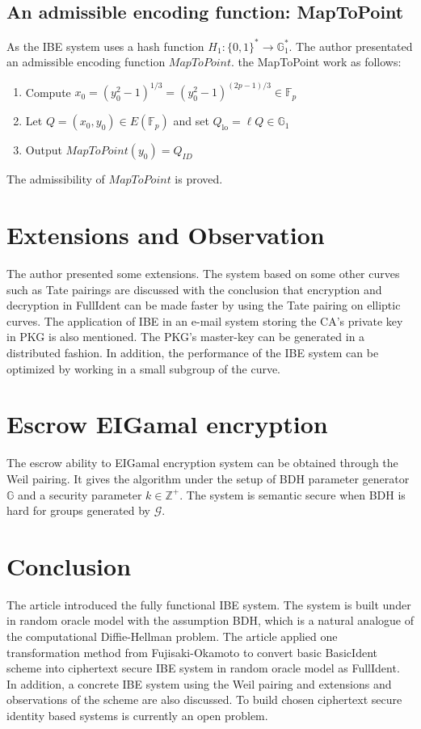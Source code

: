 \documentclass[11pt,en]{elegantpaper}
\begin{document}
\subsection{An admissible encoding function: MapToPoint}
As the IBE system uses a hash function $H_1:\{0,1\}^*\rightarrow\mathbb{G}_1^*$. The author presentated an admissible encoding function $MapToPoint$.
the MapToPoint work as follows:
\begin{enumerate}
	\item Compute $x_{0}=\left(y_{0}^{2}-1\right)^{1 / 3}=\left(y_{0}^{2}-1\right)^{(2 p-1) / 3} \in \mathbb{F}_{p}$
	\item Let $Q=\left(x_{0}, y_{0}\right) \in E\left(\mathbb{F}_{p}\right)$ and set $Q_{\mathrm{lo}}=\ell Q \in \mathbb{G}_{1}$
	\item Output $MapToPoint(y_0)=Q_{ID}$ 
\end{enumerate}
The admissibility of $MapToPoint$ is proved.

\section{Extensions and Observation}
The author presented some extensions. The system based on some other curves such as Tate pairings are discussed with the conclusion that encryption and decryption in FullIdent can be made faster by using the Tate pairing on elliptic curves. The application of IBE in an e-mail system storing the CA's private key in PKG is also mentioned. The PKG's master-key can be generated in a distributed fashion. In addition, the performance of the IBE system can be optimized by working in a small subgroup of the curve. 

\section{Escrow EIGamal encryption}
The escrow ability to EIGamal encryption system can be obtained through the Weil pairing. It gives the algorithm under the setup of BDH parameter generator $\mathbb{G}$ and a security parameter $k \in \mathbb{Z}^+$. The system is semantic secure when BDH is hard for groups generated by $\mathcal{G}$.

\section{Conclusion}
The article introduced the fully functional IBE system. The system is built under in random oracle model with the assumption BDH, which is a natural analogue of the computational Diffie-Hellman problem. The article applied one transformation method from Fujisaki-Okamoto to convert basic BasicIdent scheme into ciphertext secure IBE system in random oracle model as FullIdent. In addition, a concrete IBE system using the Weil pairing and extensions and observations of the scheme are also discussed. To build chosen ciphertext secure identity based systems is currently an open problem.

%
\end{document}

